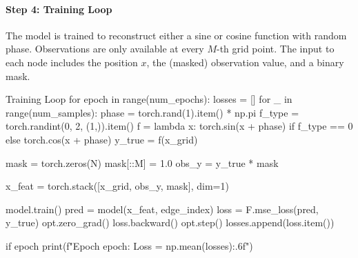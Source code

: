 \paragraph{Step 4: Training Loop}

The model is trained to reconstruct either a sine or cosine function with random phase. Observations are only available at every $M$-th grid point. The input to each node includes the position $x$, the (masked) observation value, and a binary mask.

\begin{codeonly}{Training Loop}
for epoch in range(num_epochs):
    losses = []
    for _ in range(num_samples):
        phase = torch.rand(1).item() * np.pi
        f_type = torch.randint(0, 2, (1,)).item()
        f = lambda x: torch.sin(x + phase) if f_type == 0 else torch.cos(x + phase)
        y_true = f(x_grid)

        mask = torch.zeros(N)
        mask[::M] = 1.0
        obs_y = y_true * mask

        x_feat = torch.stack([x_grid, obs_y, mask], dim=1)

        model.train()
        pred = model(x_feat, edge_index)
        loss = F.mse_loss(pred, y_true)
        opt.zero_grad()
        loss.backward()
        opt.step()
        losses.append(loss.item())

    if epoch %
        print(f"Epoch {epoch}: Loss = {np.mean(losses):.6f}")
\end{codeonly}

